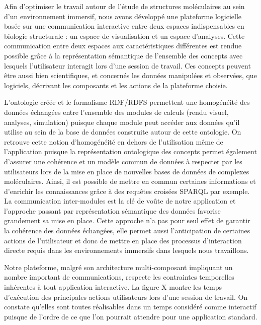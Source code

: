 Afin d'optimiser le travail autour de l'étude de structures moléculaires au sein d'un environnement immersif, nous avons développé une plateforme logicielle basée sur une communication interactive entre deux espaces indispensables en biologie structurale : un espace de visualisation et un espace d'analyses. Cette communication entre deux espaces aux caractéristiques différentes est rendue possible grâce à la représentation sémantique de l'ensemble des concepts avec lesquels l'utilisateur interagit lors d'une session de travail. Ces concepts peuvent être aussi bien scientifiques, et concernés les données manipulées et observées, que logiciels, décrivant les composants et les actions de la plateforme choisie. 

L'ontologie créée et le formalisme RDF/RDFS permettent une homogénéité des données échangées entre l'ensemble des modules de calculs (rendu visuel, analyses, simulation) puisque chaque module peut accéder aux données qu'il utilise au sein de la base de données construite autour de cette ontologie. On retrouve cette notion d'homogénéité en dehors de l'utilisation même de l'application puisque la représentation ontologique des concepts permet également d'assurer une cohérence et un modèle commun de données à respecter par les utilisateurs lors de la mise en place de nouvelles bases de données de complexes moléculaires. Ainsi, il est possible de mettre en commun certaines informations et d'enrichir les connaissances grâce à des requêtes croisées SPARQL par exemple. La communication inter-modules est la clé de voûte de notre application et l'approche passant par représentation sémantique des données favorise grandement sa mise en place. Cette approche n'a pas pour seul effet de garantir la cohérence des données échangées, elle permet aussi l'anticipation de certaines actions de l'utilisateur et donc de mettre en place des processus d'interaction directe requis dans les environnements immersifs dans lesquels nous travaillons.

Notre plateforme, malgré son architecture multi-composant impliquant un nombre important de communications, respecte les contraintes temporelles inhérentes à tout application interactive. La figure X montre les temps d'exécution des principales actions utilisateurs lors d'une session de travail. On constate qu'elles sont toutes réalisables dans un temps considéré comme interactif puisque de l'ordre de ce que l'on pourrait attendre pour une application standard.

